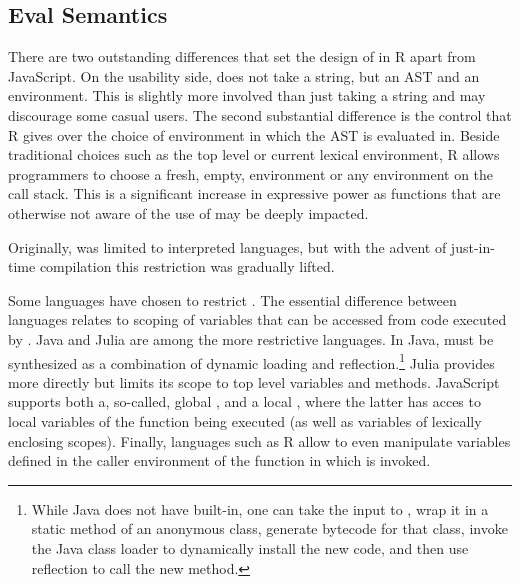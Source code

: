 \documentclass[USenglish,cleveref, autoref, thm-restate]{lipics-v2019}
\begin{document}
\subsection{Eval Semantics}

There are two outstanding differences that set
the design of \eval in R apart from JavaScript. On the usability side, \eval
does not take a string, but an AST and an environment. This is slightly more
involved than just taking a string and may discourage some casual users.
The second substantial difference is the control that R gives over the
choice of environment in which the AST is evaluated in. Beside traditional
choices such as the top level or current lexical environment, R allows
programmers to choose a fresh, empty, environment or any environment on the
call stack. This is a significant increase in expressive power as functions
that are otherwise not aware of the use of \eval may be deeply impacted.


Originally, \eval was limited to interpreted languages, but with the
advent of just-in-time compilation this restriction was gradually
lifted.

Some languages have chosen to restrict \eval. The essential difference
between languages relates to scoping of variables that can be accessed
from code executed by \eval.  Java and Julia are among the more
restrictive languages. In Java, \eval must be synthesized as a
combination of dynamic loading and reflection.\footnote{While Java
does not have \eval built-in, one can take the input to \eval, wrap it
in a static method of an anonymous class, generate bytecode for that
class, invoke the Java class loader to dynamically install the new
code, and then use reflection to call the new method.} Julia provides
\eval more directly but limits its scope to top level variables and
methods. JavaScript supports both a, so-called, global \eval, and a
local \eval, where the latter has acces to local variables of the
function being executed (as well as variables of lexically enclosing
scopes). Finally, languages such as R allow \eval to even manipulate
variables defined in the caller environment of the function in which
\eval is invoked.
\end{document}
